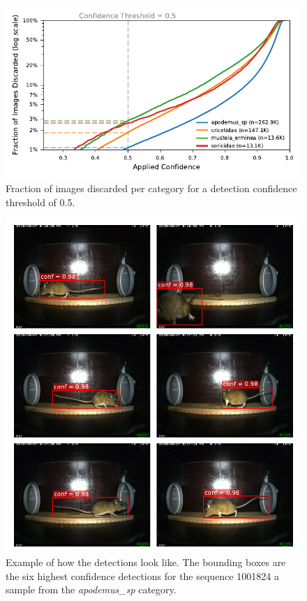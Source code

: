         \begin{figure}[ht]
        \centering
        \includegraphics{figures/discarded_img_by_conf.pdf}
        \caption{Fraction of images discarded per category for a detection confidence threshold of 0.5.}
        \label{fig:lost_images}
        \end{figure}

        \begin{figure}[ht]
        \centering
        \includegraphics{figures/detections_on_a_sequence.pdf}
        \caption{Example of how the detections look like. The bounding boxes are the six highest confidence detections for the sequence 1001824 a sample from the \textit{apodemus\_sp} category.}
        \label{fig:detection_example}
        \end{figure}

